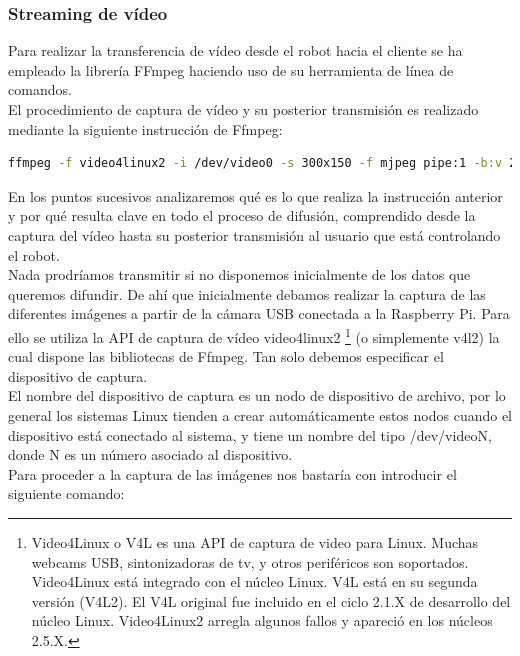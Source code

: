 \subsubsection{ Streaming de vídeo }

Para realizar la transferencia de vídeo desde el robot hacia el cliente se ha empleado la librería FFmpeg haciendo uso de su herramienta de línea de comandos.\\

El procedimiento de captura de vídeo y su posterior transmisión es realizado mediante la siguiente instrucción de Ffmpeg:\\

\begin{lstlisting}[language=bash]
  ffmpeg -f video4linux2 -i /dev/video0 -s 300x150 -f mjpeg pipe:1 -b:v 28k -bufsize 28k
\end{lstlisting}

En los puntos sucesivos analizaremos qué es lo que realiza la instrucción anterior y por qué resulta clave en todo el proceso de difusión, comprendido desde la captura del 
vídeo hasta su posterior transmisión al usuario que está controlando el robot.\\

Nada prodríamos transmitir si no disponemos inicialmente de los datos que queremos difundir. De ahí que inicialmente debamos realizar la captura de las diferentes imágenes a partir de la cámara
USB conectada a la Raspberry Pi. Para ello se utiliza la API de captura de vídeo video4linux2 \footnote{ Video4Linux o V4L es una API de captura de video para Linux. Muchas webcams USB, sintonizadoras
de tv, y otros periféricos son soportados. Video4Linux está integrado con el núcleo Linux. V4L está en su segunda versión (V4L2). El V4L original fue incluido en el ciclo 2.1.X de desarrollo del
núcleo Linux. Video4Linux2 arregla algunos fallos y apareció en los núcleos 2.5.X. } (o simplemente v4l2) la cual dispone las bibliotecas de Ffmpeg. Tan solo debemos especificar el dispositivo de 
captura.\\

El nombre del dispositivo de captura es un nodo de dispositivo de archivo, por lo general los sistemas Linux tienden a crear automáticamente estos nodos cuando el dispositivo
está conectado al sistema, y ​​tiene un nombre del tipo /dev/videoN, donde N es un número asociado al dispositivo.\\ 


Para proceder a la captura de las imágenes nos bastaría con introducir el siguiente comando:\\

